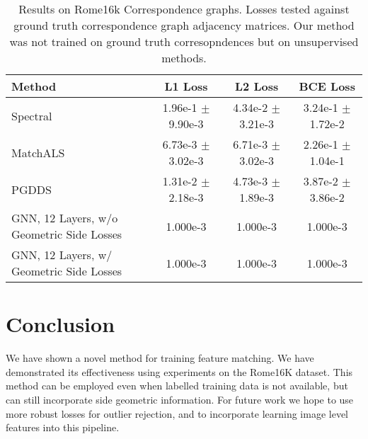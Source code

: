 \documentclass[10pt,twocolumn,letterpaper]{article}
\begin{document}
\begin{table*}
\begin{center}
\begin{tabular}{|l|c|c|c|}
\hline
Method & L1 Loss & L2 Loss & BCE Loss \\
\hline\hline\hline
Spectral                                  & 1.96e-1 $\pm$ 9.90e-3 & 4.34e-2 $\pm$ 3.21e-3 & 3.24e-1 $\pm$ 1.72e-2 \\ \hline
MatchALS                                  & 6.73e-3 $\pm$ 3.02e-3 & 6.71e-3 $\pm$ 3.02e-3 & 2.26e-1 $\pm$ 1.04e-1 \\ \hline
PGDDS                                     & 1.31e-2 $\pm$ 2.18e-3 & 4.73e-3 $\pm$ 1.89e-3 & 3.87e-2 $\pm$ 3.86e-2 \\ \hline
GNN, 12 Layers, w/o Geometric Side Losses & 1.000e-3 & 1.000e-3 & 1.000e-3 \\ \hline
GNN, 12 Layers, w/ Geometric Side Losses  & 1.000e-3 & 1.000e-3 & 1.000e-3 \\ \hline

\hline
\end{tabular}
\end{center}
\caption{
Results on Rome16k Correspondence graphs.
Losses tested against ground truth correspondence graph adjacency matrices.
Our method was not trained on ground truth corresopndences but on unsupervised methods.
}
\end{table*}





\section{Conclusion}

We have shown a novel method for training feature matching.
We have demonstrated its effectiveness using experiments on the Rome16K dataset.
This method can be employed even when labelled training data is not available, but can still incorporate side geometric information.
For future work we hope to use more robust losses for outlier rejection, and to incorporate learning image level features into this pipeline.

{\small


}
\end{document}
